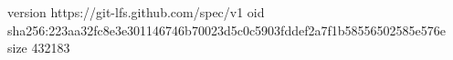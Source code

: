 version https://git-lfs.github.com/spec/v1
oid sha256:223aa32fc8e3e301146746b70023d5c0c5903fddef2a7f1b58556502585e576e
size 432183
